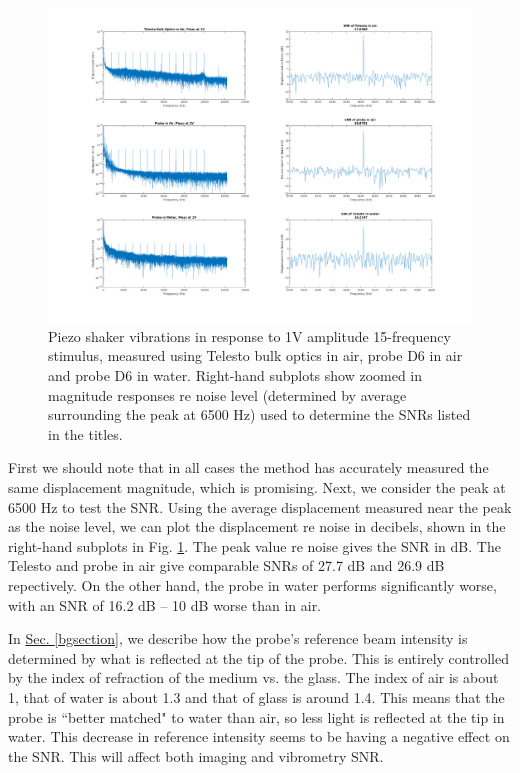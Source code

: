 \documentclass{article}
\begin{document}
\begin{figure}[!h]
	\centering
	\includegraphics[width=\textwidth]{Data for Probe Writeup/SNRcomp.png}
	\caption{Piezo shaker vibrations in response to 1V amplitude 15-frequency stimulus, measured using Telesto bulk optics in air, probe D6 in air and probe D6 in water. Right-hand subplots show zoomed in magnitude responses re noise level (determined by average surrounding the peak at 6500 Hz) used to determine the SNRs listed in the titles.}\label{airwater}
\end{figure}

\par{First we should note that in all cases the method has accurately measured the same displacement magnitude, which is promising. Next, we consider the peak at 6500 Hz to test the SNR. Using the average displacement measured near the peak as the noise level, we can plot the displacement re noise in decibels, shown in the right-hand subplots in Fig. \ref{airwater}. The peak value re noise gives the SNR in dB. The Telesto and probe in air give comparable SNRs of 27.7 dB and 26.9 dB repectively. On the other hand, the probe in water performs significantly worse, with an SNR of 16.2 dB -- 10 dB worse than in air.}

\par{In \hyperlink{bgsection}{Sec. \ref{bgsection}}, we describe how the probe's reference beam intensity is determined by what is reflected at the tip of the probe. This is entirely controlled by the index of refraction of the medium vs. the glass. The index of air is about 1, that of water is about 1.3 and that of glass is around 1.4. This means that the probe is ``better matched" to water than air, so less light is reflected at the tip in water. This decrease in reference intensity seems to be having a negative effect on the SNR. This will affect both imaging and vibrometry SNR.}
\end{document}
